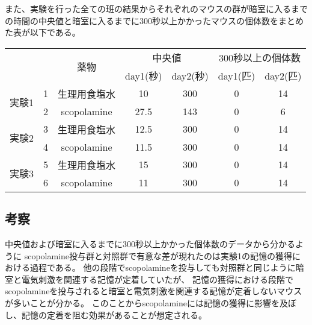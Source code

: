 \documentclass[a4paper,papersize,dvipdfmx]{jsarticle}
\begin{document}
また、実験を行った全ての班の結果からそれぞれのマウスの群が暗室に入るまでの時間の中央値と暗室に入るまでに300秒以上かかったマウスの個体数をまとめた表が以下である。

\begin{table}[H]
\centering
\begin{tabular}{|c|c|c|c|c|c|c|}
\hline
\multicolumn{2}{|c|}{\multirow{2}{*}{}} & \multirow{2}{*}{薬物} & \multicolumn{2}{c|}{中央値} & \multicolumn{2}{c|}{300秒以上の個体数} \\ \cline{4-7}
\multicolumn{2}{|c|}{}                  &                     & day1(秒)     & day2(秒)    & day1(匹)        & day2(匹)        \\ \hline
\multirow{2}{*}{実験1}         & 1        & 生理用食塩水              & 10          & 300        & 0              & 14             \\ \cline{2-7}
& 2        & scopolamine         & 27.5        & 143        & 0              & 6              \\ \hline
\multirow{2}{*}{実験2}         & 3        & 生理用食塩水              & 12.5        & 300        & 0              & 14             \\ \cline{2-7}
& 4        & scopolamine         & 11.5        & 300        & 0              & 14             \\ \hline
\multirow{2}{*}{実験3}         & 5        & 生理用食塩水              & 15          & 300        & 0              & 14             \\ \cline{2-7}
& 6        & scopolamine         & 11          & 300        & 0              & 14             \\ \hline
\end{tabular}
\end{table}

\subsection*{考察}
中央値および暗室に入るまでに300秒以上かかった個体数のデータから分かるように
scopolamine投与群と対照群で有意な差が現れたのは実験1の記憶の獲得における過程である。
他の段階でscopolamineを投与しても対照群と同じように暗室と電気刺激を関連する記憶が定着していたが、
記憶の獲得における段階でscopolamineを投与されると暗室と電気刺激を関連する記憶が定着しないマウスが多いことが分かる。
このことからscopolamineには記憶の獲得に影響を及ぼし、記憶の定着を阻む効果があることが想定される。
\end{document}

